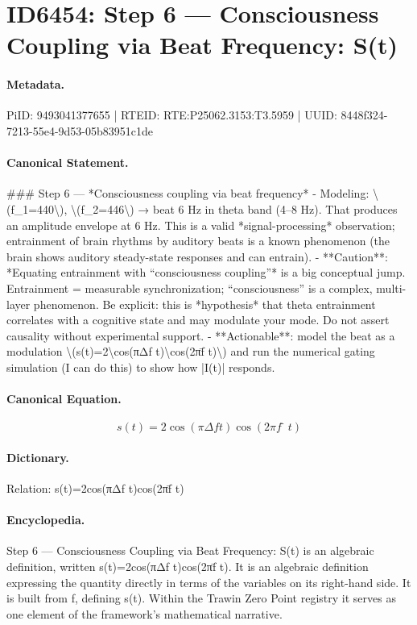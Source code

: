 \section*{ID6454: Step 6 — Consciousness Coupling via Beat Frequency: S(t)}
\paragraph{Metadata.}
PiID: 9493041377655 | RTEID: RTE:P25062.3153:T3.5959 | UUID: 8448f324-7213-55e4-9d53-05b83951c1de

\paragraph{Canonical Statement.}
\#\#\# Step 6 — *Consciousness coupling via beat frequency* - Modeling: \textbackslash{}(f\_1=440\textbackslash{}), \textbackslash{}(f\_2=446\textbackslash{}) → beat 6 Hz in theta band (4–8 Hz). That produces an amplitude envelope at 6 Hz. This is a valid *signal-processing* observation; entrainment of brain rhythms by auditory beats is a known phenomenon (the brain shows auditory steady-state responses and can entrain). - **Caution**: *Equating entrainment with “consciousness coupling”* is a big conceptual jump. Entrainment = measurable synchronization; “consciousness” is a complex, multi-layer phenomenon. Be explicit: this is *hypothesis* that theta entrainment correlates with a cognitive state and may modulate your mode. Do not assert causality without experimental support. - **Actionable**: model the beat as a modulation \textbackslash{}(s(t)=2\textbackslash{}cos(πΔf t)\textbackslash{}cos(2πf̄ t)\textbackslash{}) and run the numerical gating simulation (I can do this) to show how |I(t)| responds.

\paragraph{Canonical Equation.}
\[
s(t)=2\cos(πΔf t)\cos(2πf̄ t)
\]

\paragraph{Dictionary.}
Relation: s(t)=2cos(πΔf t)cos(2πf̄ t)

\paragraph{Encyclopedia.}
Step 6 — Consciousness Coupling via Beat Frequency: S(t) is an algebraic definition, written s(t)=2cos(πΔf t)cos(2πf̄ t). It is an algebraic definition expressing the quantity directly in terms of the variables on its right-hand side. It is built from f, defining s(t). Within the Trawin Zero Point registry it serves as one element of the framework's mathematical narrative.
